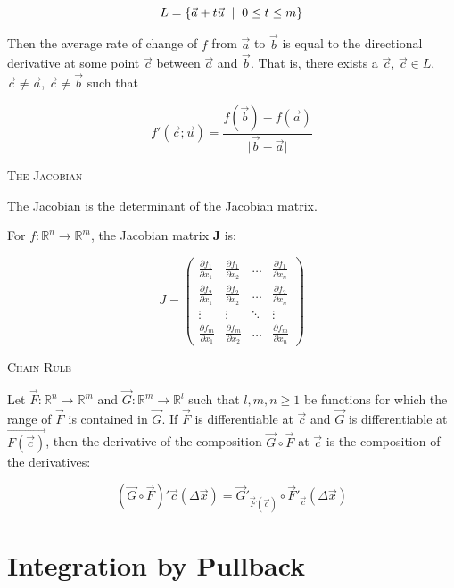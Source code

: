\documentclass{article}
\begin{document}
\[
L = \{\vec{a} + t\vec{u} \hspace{2mm} \lvert \hspace{2mm} 0 \le t \le m  \}
\]

Then the average rate of change of $f$ from $\vec{a}$ to $\vec{b}$ is equal to the directional derivative at some point $\vec{c}$ between $\vec{a}$ and $\vec{b}$.  That is, there exists a $\vec{c}$, $\vec{c} \in L$, $\vec{c} \neq \vec{a}$, $\vec{c} \neq \vec{b}$ such that

\[
f'(\vec{c}; \vec{u}) = \frac{f(\vec{b}) - f(\vec{a})}{\lvert \vec{b} - \vec{a} \rvert}
\]

\bigskip

\textsc{The Jacobian}

The Jacobian is the determinant of the Jacobian matrix.

For $f:\mathbb{R}^n \to \mathbb{R}^m$, the Jacobian matrix \textbf{J} is:

\[
J = \left( \begin{array}{cccc}
\frac{\partial{f_1}}{\partial{x_1}} & \frac{\partial{f_1}}{\partial{x_2}} & \ldots & \frac{\partial{f_1}}{\partial{x_n}} \\
\frac{\partial{f_2}}{\partial{x_1}} & \frac{\partial{f_2}}{\partial{x_2}} & \ldots & \frac{\partial{f_2}}{\partial{x_n}} \\
\vdots & \vdots & \ddots & \vdots \\
\frac{\partial{f_m}}{\partial{x_1}} & \frac{\partial{f_m}}{\partial{x_2}} & \ldots & \frac{\partial{f_m}}{\partial{x_n}}
\end{array} \right)
\]

\bigskip

\textsc{Chain Rule}

Let $\vec{F}: \mathbb{R}^n \to \mathbb{R}^m$ and $\vec{G}: \mathbb{R}^m \to \mathbb{R}^l$ such that $l, m, n \ge 1$ be functions for which the range of $\vec{F}$ is contained in $\vec{G}$.  If $\vec{F}$ is differentiable at $\vec{c}$ and $\vec{G}$ is differentiable at $\vec{F(\vec{c})}$, then the derivative of the composition $\vec{G} \circ \vec{F}$ at $\vec{c}$ is the composition of the derivatives:

\[
(\vec{G} \circ \vec{F})'\vec{c}(\Delta{\vec{x}}) = \vec{G}'_{\vec{F}(\vec{c})} \circ \vec{F}'_{\vec{c}}(\Delta{\vec{x}})
\]

\bigskip

\section{Integration by Pullback}
\end{document}

